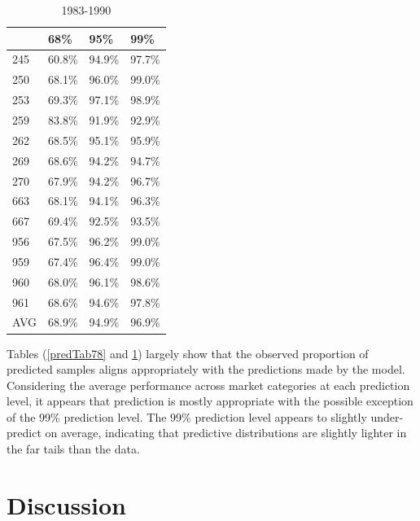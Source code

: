 \documentclass[12pt]{article}
\begin{document}
\begin{table}[h!]
\centering
\begin{tabular}[c]{@{}llll@{}}
\hline
& 68\% & 95\% & 99\% \\ \hline
245 & 60.8\% & 94.9\% & 97.7\% \\  
250 & 68.1\% & 96.0\% & 99.0\% \\
253 & 69.3\% & 97.1\% & 98.9\% \\
259 & 83.8\% & 91.9\% & 92.9\% \\
262 & 68.5\% & 95.1\% & 95.9\% \\
269 & 68.6\% & 94.2\% & 94.7\% \\
270 & 67.9\% & 94.2\% & 96.7\% \\
663 & 68.1\% & 94.1\% & 96.3\% \\
667 & 69.4\% & 92.5\% & 93.5\% \\
956 & 67.5\% & 96.2\% & 99.0\% \\
959 & 67.4\% & 96.4\% & 99.0\% \\
960 & 68.0\% & 96.1\% & 98.6\% \\
961 & 68.6\% & 94.6\% & 97.8\% \\
AVG & 68.9\% & 94.9\% & 96.9\% \\ \hline
\end{tabular}
\caption{1983-1990}
\label{predTab83}
\end{table}

Tables (\ref{predTab78} and \ref{predTab83}) largely show that the observed 
proportion of predicted samples aligns appropriately with the predictions made 
by the model. Considering the average performance across market categories 
at each prediction level, it appears that prediction is mostly appropriate 
with the possible exception of the 99\% prediction level. The 99\% prediction 
level appears to slightly under-predict on average, indicating that predictive 
distributions are slightly lighter in the far tails than the data.

%
%
\section{Discussion}\label{discussion}
%
%
\end{document}
